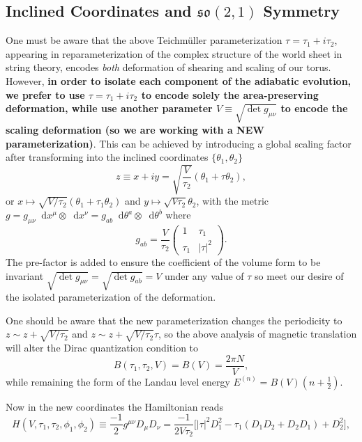 \documentclass[10pt,nofootinbib,letterpaper]{revtex4}
\newcommand*\dd{\mathop{}\!\mathrm{d}}
\begin{document}
	\subsection{Inclined Coordinates and $\mathfrak{so}(2,1)$ Symmetry}
		One must be aware that the above Teichm\"{u}ller parameterization $\tau=\tau_1+i\tau_2$, appearing in reparameterization of the complex structure of the world sheet in string theory, encodes \emph{both} deformation of shearing and scaling of our torus. However, \textbf{\color{red}in order to isolate each component of the adiabatic evolution, we prefer to use $\tau=\tau_1+i\tau_2$ to encode solely the area-preserving deformation, while use another parameter $V\equiv\sqrt{\det g_{\mu\nu}}$ to encode the scaling deformation (so we are working with a NEW parameterization)}. This can be achieved by introducing a global scaling factor after transforming into the inclined coordinates $\{\theta_1,\theta_2\}$
		\begin{equation*}
			z\equiv x+iy=\sqrt{\dfrac{V}{\tau_2}}(\theta_1+\tau\theta_2),
		\end{equation*}
		or $x\mapsto\sqrt{V/\tau_2}(\theta_1+\tau_1\theta_2)$ and $y\mapsto\sqrt{V\tau_2}\theta_2$, with the metric $g=g_{\mu\nu}\dd x^\mu\otimes\dd x^\nu=g_{ab}\dd\theta^a\otimes\dd\theta^b$ where
		\begin{equation*}
			g_{ab}=\dfrac{V}{\tau_2}\left(\begin{array}{cc}
				1&\tau_1\\\tau_1&|\tau|^2
			\end{array}\right).
		\end{equation*}
		The pre-factor is added to ensure the coefficient of the volume form to be invariant $\sqrt{\det g_{\mu\nu}}=\sqrt{\det g_{ab}}=V$ under any value of $\tau$ so meet our desire of the isolated parameterization of the deformation.\par
		One should be aware that the new parameterization changes the periodicity to $z\sim z+\sqrt{V/\tau_2}$ and $z\sim z+\sqrt{V/\tau_2}\tau$, so the above analysis of magnetic translation will alter the Dirac quantization condition to
		\begin{equation}\label{2.3.0}
			B(\tau_1,\tau_2,V)=B(V)=\dfrac{2\pi N}{V},
		\end{equation}
		while remaining the form of the Landau level energy $E^{(n)}=B(V)(n+\frac12)$.\par
		Now in the new coordinates the Hamiltonian reads
		\begin{equation}\label{2.3.1}
			H(V,\tau_1,\tau_2,\phi_1,\phi_2)\equiv\dfrac{-1}{2}g^{\mu\nu}D_\mu D_\nu=\dfrac{-1}{2V\tau_2}\bigg[|\tau|^2D_1^2-\tau_1(D_1 D_2+D_2D_1)+D_2^2\bigg],
		\end{equation}
\end{document}

